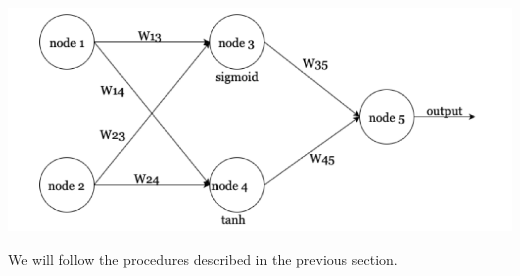 \documentclass{article}
\begin{document}
\begin{center}
    
\includegraphics[scale=0.4]{nn.png}
\end{center}

We will follow the procedures described in the previous section.
\end{document}
